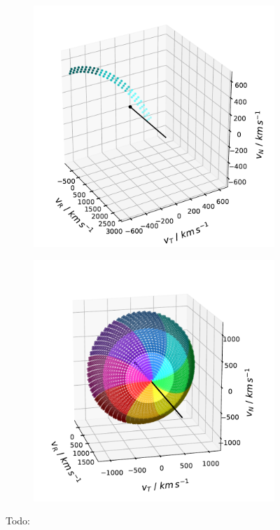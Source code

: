 %
%
%
\begin{figure}
	\centering
	\begin{subfigure}{.5\textwidth}
		\centering
		\includegraphics[width=1\linewidth]{Figures/col_single_new.pdf}
	\end{subfigure}%
	\begin{subfigure}{.5\textwidth}
		\centering
		\includegraphics[width=1\linewidth]{Figures/col_vspace_normal.pdf}
	\end{subfigure}
	\caption{Todo: }
	\label{fig:coll_FoV}
\end{figure}
